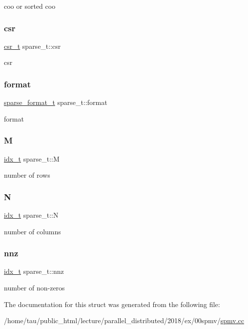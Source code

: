 coo or sorted coo \mbox{\label{structsparse__t_a68a71613181b0380d0d4d871236b2521}} 
\subsubsection{\texorpdfstring{csr}{csr}}
{\footnotesize\ttfamily \hyperlink{structcsr__t}{csr\+\_\+t} sparse\+\_\+t\+::csr}

csr \mbox{\label{structsparse__t_a1bb9e61c965f9ea814aab21f7ff77a73}} 
\subsubsection{\texorpdfstring{format}{format}}
{\footnotesize\ttfamily \hyperlink{spmv_8cc_a8c0094893526c01b430903b2d9227256}{sparse\+\_\+format\+\_\+t} sparse\+\_\+t\+::format}

format \mbox{\label{structsparse__t_a8a08bd7a16c76180afccf05e28f72a93}} 
\subsubsection{\texorpdfstring{M}{M}}
{\footnotesize\ttfamily \hyperlink{spmv_8cc_a8e93478a00e685bea5e6a3f617bf03a3}{idx\+\_\+t} sparse\+\_\+t\+::M}

number of rows \mbox{\label{structsparse__t_a418c6deef17a60f31ff11182ea94f85a}} 
\subsubsection{\texorpdfstring{N}{N}}
{\footnotesize\ttfamily \hyperlink{spmv_8cc_a8e93478a00e685bea5e6a3f617bf03a3}{idx\+\_\+t} sparse\+\_\+t\+::N}

number of columns \mbox{\label{structsparse__t_ae982d138f3904323b65975769b045a3f}} 
\subsubsection{\texorpdfstring{nnz}{nnz}}
{\footnotesize\ttfamily \hyperlink{spmv_8cc_a8e93478a00e685bea5e6a3f617bf03a3}{idx\+\_\+t} sparse\+\_\+t\+::nnz}

number of non-\/zeros 

The documentation for this struct was generated from the following file\+:\begin{DoxyCompactItemize}
\item 
/home/tau/public\+\_\+html/lecture/parallel\+\_\+distributed/2018/ex/00spmv/\hyperlink{spmv_8cc}{spmv.\+cc}\end{DoxyCompactItemize}
